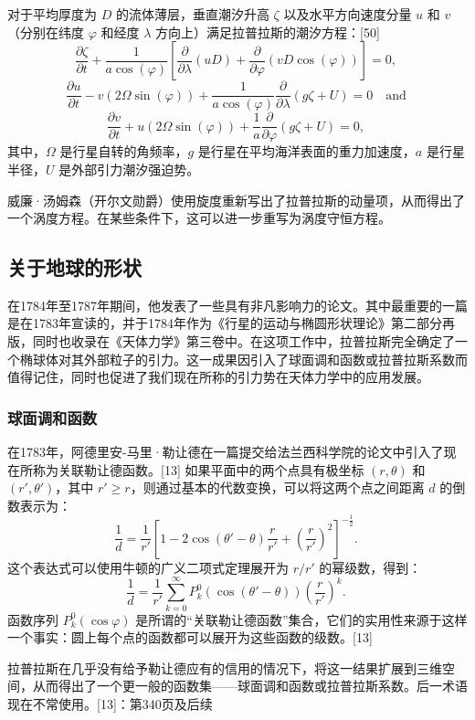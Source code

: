 对于平均厚度为 \( D \) 的流体薄层，垂直潮汐升高 \( \zeta \) 以及水平方向速度分量 \( u \) 和 \( v \)（分别在纬度 \( \varphi \) 和经度 \( \lambda \) 方向上）满足拉普拉斯的潮汐方程：[50]
\[
\frac{\partial \zeta}{\partial t} + \frac{1}{a \cos(\varphi)} \left[ \frac{\partial}{\partial \lambda} (uD) + \frac{\partial}{\partial \varphi} \left( vD \cos(\varphi) \right) \right] = 0,~
\]
\[
\frac{\partial u}{\partial t} - v \left( 2 \Omega \sin(\varphi) \right) + \frac{1}{a \cos(\varphi)} \frac{\partial}{\partial \lambda} \left( g \zeta + U \right) = 0 \quad \text{and}~
\]
\[
\frac{\partial v}{\partial t} + u \left( 2 \Omega \sin(\varphi) \right) + \frac{1}{a} \frac{\partial}{\partial \varphi} \left( g \zeta + U \right) = 0,~
\]
其中，\( \Omega \) 是行星自转的角频率，\( g \) 是行星在平均海洋表面的重力加速度，\( a \) 是行星半径，\( U \) 是外部引力潮汐强迫势。

威廉·汤姆森（开尔文勋爵）使用旋度重新写出了拉普拉斯的动量项，从而得出了一个涡度方程。在某些条件下，这可以进一步重写为涡度守恒方程。
\subsection{关于地球的形状}  
在1784年至1787年期间，他发表了一些具有非凡影响力的论文。其中最重要的一篇是在1783年宣读的，并于1784年作为《行星的运动与椭圆形状理论》第二部分再版，同时也收录在《天体力学》第三卷中。在这项工作中，拉普拉斯完全确定了一个椭球体对其外部粒子的引力。这一成果因引入了球面调和函数或拉普拉斯系数而值得记住，同时也促进了我们现在所称的引力势在天体力学中的应用发展。
\subsubsection{球面调和函数}
在1783年，阿德里安-马里·勒让德在一篇提交给法兰西科学院的论文中引入了现在所称为关联勒让德函数。[13] 如果平面中的两个点具有极坐标 \((r, \theta)\) 和 \((r', \theta')\)，其中 \(r' \geq r\)，则通过基本的代数变换，可以将这两个点之间距离 \(d\) 的倒数表示为：
\[
\frac{1}{d} = \frac{1}{r'} \left[ 1 - 2 \cos(\theta' - \theta) \frac{r}{r'} + \left( \frac{r}{r'} \right)^2 \right]^{-\frac{1}{2}}.~
\]
这个表达式可以使用牛顿的广义二项式定理展开为 \(r/r'\) 的幂级数，得到：
\[
\frac{1}{d} = \frac{1}{r'} \sum_{k=0}^{\infty} P_k^0 (\cos(\theta' - \theta)) \left( \frac{r}{r'} \right)^k.~
\]
函数序列 \( P_k^0(\cos \varphi) \) 是所谓的“关联勒让德函数”集合，它们的实用性来源于这样一个事实：圆上每个点的函数都可以展开为这些函数的级数。[13]

拉普拉斯在几乎没有给予勒让德应有的信用的情况下，将这一结果扩展到三维空间，从而得出了一个更一般的函数集——球面调和函数或拉普拉斯系数。后一术语现在不常使用。[13]：第340页及后续
